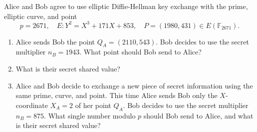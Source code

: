 \begin{exercise}{6.14}
    Alice and Bob agree to use elliptic Diffie-Hellman key exchange with the prime, elliptic curve, and point
    \[
    p = 2671, \quad E: Y^2 = X^3 + 171X + 853, \quad P = (1980, 431) \in E(\mathbb{F}_{2671}).
    \]
    \begin{enumerate}
        \item Alice sends Bob the point \( Q_A = (2110, 543) \). Bob decides to use the secret multiplier \( n_B = 1943 \). What point should Bob send to Alice?
        \item What is their secret shared value?
        \setcounter{enumi}{3}
        \item Alice and Bob decide to exchange a new piece of secret information using the same prime, curve, and point. This time Alice sends Bob only the \( X \)-coordinate \( X_A = 2 \) of her point \( Q_A \). Bob decides to use the secret multiplier \( n_B = 875 \). 
        What single number modulo \(p\) should Bob send to Alice, and what is their secret shared value?
    \end{enumerate}
\end{exercise}


